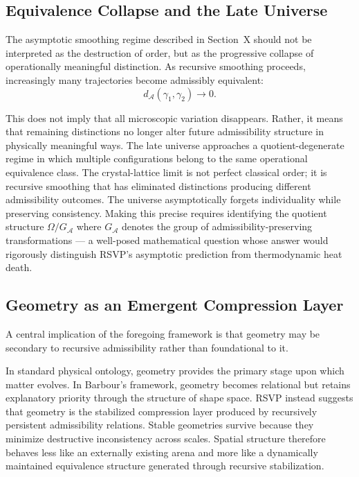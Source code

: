 \documentclass[12pt, a4paper]{article}
\newcommand{\Afield}{\mathcal{A}}
\begin{document}
\subsection{Equivalence Collapse and the Late Universe}

The asymptotic smoothing regime described in Section~X should not be
interpreted as the destruction of order, but as the progressive collapse of
operationally meaningful distinction. As recursive smoothing proceeds,
increasingly many trajectories become admissibly equivalent:
\[
d_{\Afield}(\gamma_1,\gamma_2) \to 0.
\]

This does not imply that all microscopic variation disappears. Rather, it
means that remaining distinctions no longer alter future admissibility
structure in physically meaningful ways. The late universe approaches a
quotient-degenerate regime in which multiple configurations belong to the
same operational equivalence class. The crystal-lattice limit is not perfect
classical order; it is recursive smoothing that has eliminated distinctions
producing different admissibility outcomes. The universe asymptotically
forgets individuality while preserving consistency. Making this precise
requires identifying the quotient structure \(\Omega/G_{\Afield}\) where
\(G_{\Afield}\) denotes the group of admissibility-preserving
transformations — a well-posed mathematical question whose answer would
rigorously distinguish RSVP's asymptotic prediction from thermodynamic
heat death.

\subsection{Geometry as an Emergent Compression Layer}

A central implication of the foregoing framework is that geometry may be
secondary to recursive admissibility rather than foundational to it.

In standard physical ontology, geometry provides the primary stage upon
which matter evolves. In Barbour's framework, geometry becomes relational
but retains explanatory priority through the structure of shape space. RSVP
instead suggests that geometry is the stabilized compression layer produced
by recursively persistent admissibility relations. Stable geometries survive
because they minimize destructive inconsistency across scales. Spatial
structure therefore behaves less like an externally existing arena and more
like a dynamically maintained equivalence structure generated through
recursive stabilization.
\end{document}
